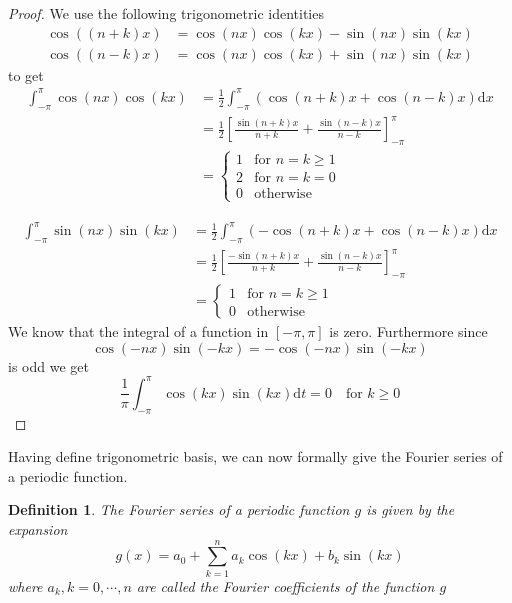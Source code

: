 \documentclass[11pt, oneside]{article}   	%
\newtheorem{definition}{Definition}
\newtheorem{proof}{Proof}
\begin{document}
\begin{proof}
We use the following trigonometric identities 
\begin{equation}
\begin{split}
\cos((n+k)x) &= \cos(nx)\cos(kx) - \sin(nx)\sin(kx)\\
\cos((n-k)x) &= \cos(nx)\cos(kx) + \sin(nx)\sin(kx) \nonumber
\end{split}
\end{equation}
to get 
\begin{equation}
\begin{split}
\int_{-\pi}^{\pi} \cos(nx)\cos(kx) &= \frac{1}{2}\int_{-\pi}^{\pi}(\cos(n+k)x + \cos(n-k)x)\mathrm{d}x \\
&=\frac{1}{2}\left [  \frac{\sin(n+k)x}{n+k} + \frac{\sin(n-k)x}{n-k} \right ]_{-\pi}^{\pi}\\
&=\begin{cases}
  1 & \text{for } n=k \geq 1\\    
  2 & \text{for } n = k = 0\\
  0 & \text{otherwise}  
\end{cases}  \nonumber 
\end{split}
\end{equation}

\begin{equation}
\begin{split}
\int_{-\pi}^{\pi} \sin(nx)\sin(kx) &= \frac{1}{2}\int_{-\pi}^{\pi}(-\cos(n+k)x + \cos(n-k)x)\mathrm{d}x \\
&=\frac{1}{2}\left [  \frac{-\sin(n+k)x}{n+k} + \frac{\sin(n-k)x}{n-k} \right ]_{-\pi}^{\pi}\\
&=\begin{cases}
  1 & \text{for } n=k \geq 1\\    
  0 & \text{otherwise}  
\end{cases}  \nonumber 
\end{split}
\end{equation}
We know that the integral of a function in $[-\pi, \pi]$ is zero. Furthermore since
\begin{equation}
\cos(-nx)\sin(-kx) = - \cos(-nx)\sin(-kx) \nonumber
\end{equation}
is odd we get 
\begin{equation}
 \frac{1}{\pi}\int_{-\pi}^{\pi} \cos(kx)\sin(kx) \mathrm{d}t = 0 \quad \text{for } k\geq 0
\end{equation}
\end{proof}
\justify
Having define trigonometric basis, we can now formally give the Fourier series of a periodic function.
\begin{definition}
The Fourier series of a periodic function $g$ is given by the expansion 
\begin{equation}
g(x) = a_{0} + \sum_{k=1}^{n}a_{k}\cos(kx)+b_{k}\sin(kx)
\end{equation}
where $a_{k}, k=0,\cdots, n$ are called the Fourier coefficients of the function $g$
\end{definition}
\end{document}
